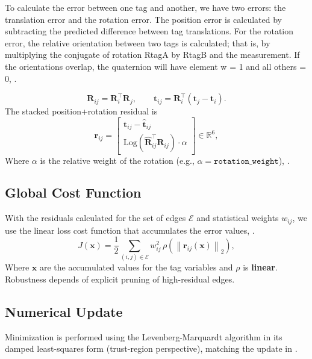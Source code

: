 To calculate the error between one tag and another, we have two errors: the translation error and the rotation error. The position error is calculated by subtracting the predicted difference between tag translations. For the rotation error, the relative orientation between two tags is calculated; that is, by multiplying the conjugate of rotation RtagA by RtagB and the measurement. If the orientations overlap, the quaternion will have element w = 1 and all others = 0, \cite{barfoot2024state}.

\begin{equation}
	\mathbf{R}_{ij} = \mathbf{R}_i^\top \mathbf{R}_j, \qquad
	\mathbf{t}_{ij} = \mathbf{R}_i^\top (\mathbf{t}_j - \mathbf{t}_i).
\end{equation}
The stacked position+rotation residual is
\begin{equation}
	\mathbf{r}_{ij} = 
	\begin{bmatrix}
		\mathbf{t}_{ij} - \hat{\mathbf{t}}_{ij} \\
		\mathrm{Log}\left( \hat{\mathbf{R}}_{ij}^\top \mathbf{R}_{ij} \right) \cdot \alpha
	\end{bmatrix}
	\in \mathbb{R}^6,
\end{equation}
Where $\alpha$ is the relative weight of the rotation (e.g., $\alpha = \texttt{rotation\_weight}$), \cite{barfoot2024state}. 

\subsection{Global Cost Function}

With the residuals calculated for the set of edges $\mathcal{E}$ and statistical weights $w_{ij}$, we use the linear loss cost function that accumulates the error values, \cite{barfoot2024state}.
\begin{equation}
	J(\mathbf{x}) = \frac{1}{2} \sum_{(i,j)\in \mathcal{E}} w_{ij}^2 \, \rho\left( \left\| \mathbf{r}_{ij}(\mathbf{x}) \right\|_2 \right),
\end{equation}
Where $\mathbf{x}$ are the accumulated values for the tag variables and $\rho$ is \textbf{linear}. Robustness depends of explicit pruning of high-residual edges.

\subsection{Numerical Update}
Minimization is performed using the Levenberg-Marquardt algorithm in its damped least-squares form (trust-region perspective), matching the update in \cite{turkulainen20243dgs}.

